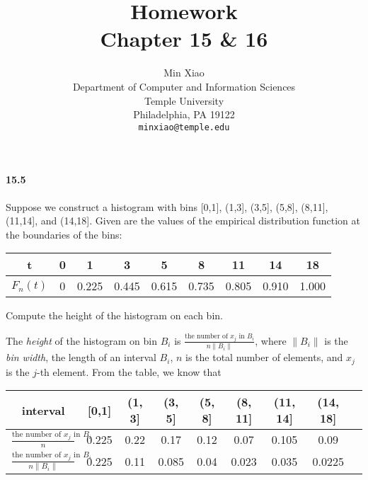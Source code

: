 \documentclass{article} %
\title{Homework \\
Chapter 15 \& 16}
\author{
Min Xiao\\
Department of Computer and Information Sciences\\
Temple University\\
Philadelphia, PA 19122 \\
\texttt{minxiao@temple.edu} \\
}
\begin{document}
\maketitle

\paragraph*{15.5} Suppose we construct a histogram with bins [0,1], (1,3], (3,5], (5,8], (8,11], (11,14], and (14,18]. Given are the values of the empirical distribution function at the boundaries of the bins:
\begin{table}[h!]
\centering
\begin{tabular}{ccccccccc}
t & 0 & 1 & 3 & 5 & 8 & 11 & 14 & 18 \\  \hline
$F_n(t)$ & 0 & 0.225 & 0.445 & 0.615 & 0.735 & 0.805 & 0.910 & 1.000 \\  \hline
\end{tabular}
\end{table}
Compute the height of the histogram on each bin.

The {\it height} of the histogram on bin $B_i$ is $\frac{\text{the number of } x_j \text{ in } B_i}{n\|B_i\|}$, where $\|B_i\|$ is the {\it bin width}, the length of an interval $B_i$, $n$ is the total number of elements, and $x_j$ is the $j$-th element. 
From the table, we know that 
\begin{table}[h!]
\centering
\begin{tabular}{ccccccccc} \\ \hline
interval & [0,1] & (1, 3] & (3, 5] & (5, 8] & (8, 11] & (11, 14] & (14, 18] \\  \hline
$\frac{\text{the number of } x_j \text{ in } B_i}{n}$ & 0.225 & 0.22 & 0.17 & 0.12 & 0.07 & 0.105 & 0.09  \\  \hline 
$\frac{\text{the number of } x_j \text{ in } B_i}{n\|B_i\|}$ & 0.225 & 0.11 & 0.085 & 0.04 & 0.023 & 0.035 & 0.0225  \\ \hline
\end{tabular}
\end{table}
\end{document}
